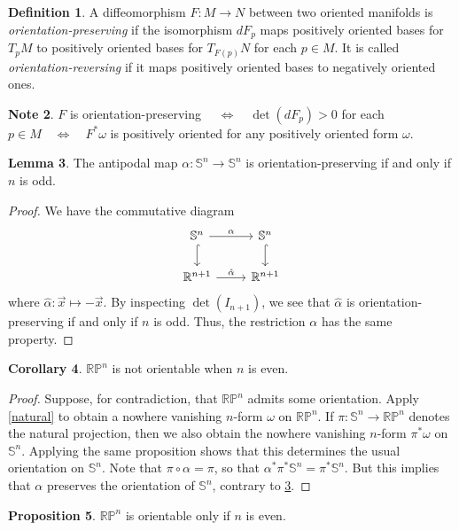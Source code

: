 \documentclass[10pt,letterpaper,cm]{nupset}
\theoremstyle{definition}
\newtheorem{definition}{Definition}[subsection]
\newtheorem{note}[definition]{Note}
\theoremstyle{theorem}
\newtheorem{lemma}[definition]{Lemma}
\newtheorem{prop}[definition]{Proposition}
\newtheorem{corollary}[definition]{Corollary}
\theoremstyle{remark}
\newcommand{\R}{\mathbb R}
\newcommand{\RP}{\mathbb{RP}}
\renewcommand{\S}{\mathbb S}
\newcommand{\1}{\mathbf{1}}
\newcommand{\x}{\vec x}
\newcommand{\0}{\vec 0}
\begin{document}
\begin{definition}
A diffeomorphism $F: M \to N$ between two oriented manifolds is \textit{orientation-preserving} if the isomorphism $dF_p$ maps positively oriented bases for $T_pM$ to positively oriented bases for $T_{F(p)}N$ for each $p\in M$. It is called \textit{orientation-reversing} if it maps positively oriented bases to negatively oriented ones.
\end{definition}

\begin{note}
$F$ is orientation-preserving $\quad \iff \quad  \det(dF_p) >0$ for each $p \in M \quad \iff \quad F^{\ast}\omega$ is positively oriented for any positively oriented form $\omega$.
\end{note}

\begin{lemma}\label{antip}
The antipodal map $\alpha : \S^n \to \S^n$ is orientation-preserving  if and only if $n$ is odd.
\end{lemma}
\begin{proof}
We have the commutative diagram
\[
\begin{tikzcd}
\S^n \arrow[r, "\alpha"] \arrow[d, hook] & \S^n \arrow[d, hook] \\
\R^{n+1} \arrow[r, "\hat{\alpha}"] & \R^{n+1}
\end{tikzcd}
\]
where $\hat{\alpha} : \x \mapsto -\x$. By inspecting $\det(I_{n+1})$, we see that $\hat{\alpha}$ is orientation-preserving  if and only if $n$ is odd. Thus, the restriction $\alpha$ has the same property.
\end{proof}

\begin{corollary}
$\RP^n$ is not orientable when $n$ is even. 
\end{corollary}
\begin{proof}
Suppose, for contradiction, that $\RP^n$ admits some orientation. Apply \cref{natural} to obtain a nowhere vanishing $n$-form $\omega$ on $\RP^n$. If $\pi : \S^n \to \RP^n$ denotes the natural projection, then we also obtain the nowhere vanishing $n$-form $\pi^{\ast}\omega$ on $\S^n$. Applying the same proposition shows that this determines the usual orientation on $\S^n$. Note that $\pi \circ \alpha = \pi$, so that $\alpha^{\ast} \pi^{\ast} \S^n = \pi^{\ast}\S^n$. But this implies that $\alpha$ preserves the orientation of $\S^n$, contrary to \cref{antip}.
\end{proof}

\begin{prop}
$\RP^n$ is orientable only if $n$ is even. 
\end{prop}
\end{document}
